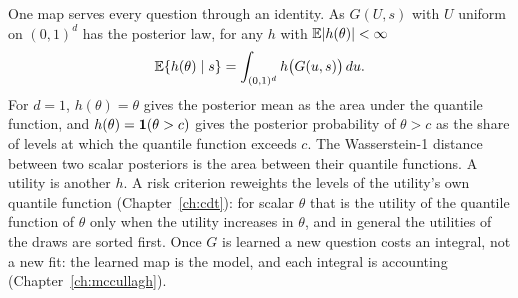 One map serves every question through an identity. As $G(U,s)$ with $U$ uniform on $(0,1)^d$ has the posterior law, for any $h$ with $\mathbb{E}\lvert h(\theta)\rvert<\infty$
\begin{equation}\label{comp:eq:quantileidentity}
\mathbb{E}\{h(\theta)\mid s\} = \int_{(0,1)^d} h\bigl(G(u,s)\bigr)\,du.
\end{equation}
For $d=1$, $h(\theta)=\theta$ gives the posterior mean as the area under the quantile function, and $h(\theta)=\mathbf{1}(\theta>c)$ gives the posterior probability of $\theta>c$ as the share of levels at which the quantile function exceeds $c$. The Wasserstein-1 distance between two scalar posteriors is the area between their quantile functions. A utility is another $h$. A risk criterion reweights the levels of the utility's own quantile function (Chapter~\ref{ch:cdt}): for scalar $\theta$ that is the utility of the quantile function of $\theta$ only when the utility increases in $\theta$, and in general the utilities of the draws are sorted first. Once $G$ is learned a new question costs an integral, not a new fit: the learned map is the model, and each integral is accounting (Chapter~\ref{ch:mccullagh}).
